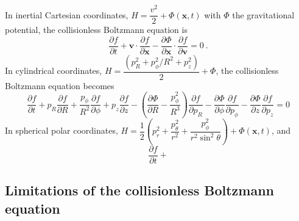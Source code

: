 \documentclass[12pt,a4paper]{article}
\renewcommand{\vec}[1]{\boldsymbol{#1}}
\begin{document}
In inertial Cartesian coordinates, $H = \dfrac{v^2}{2} + \Phi(\vec{x}, t)$ with $\Phi$ the gravitational potential, the collisionless Boltzmann equation is
\begin{equation}
\frac{\partial f}{\partial t} +\vec{v} \cdot \frac{\partial f}{\partial \vec{x}} -\frac{\partial \Phi}{\partial \vec{x}}\cdot \frac{\partial f}{\partial \vec{v}} = 0 ~.
\end{equation}
In cylindrical coordinates, $H = \dfrac{ (p_R^2 +p_\phi^2/R^2 +p_z^2) }{2}+\Phi$, the collisionless Boltzmann equation becomes
\begin{equation}
\frac{\partial f}{\partial t} +p_R \frac{\partial f}{\partial R} +\frac{p_\phi}{R^2} \frac{\partial f}{\partial \phi} +p_z \frac{\partial f}{\partial z} -\left(\frac{\partial \Phi}{\partial R} -\frac{p^2_\phi}{R^3} \right)\frac{\partial f}{\partial p_R} -\frac{\partial \Phi}{\partial \phi} \frac{\partial f}{\partial p_\phi} -\frac{\partial \Phi}{\partial z} \frac{\partial f}{\partial p_z} = 0
\end{equation}
In spherical polar coordinates, $H = \dfrac{1}{2}\left(p_r^2 +\dfrac{p_\theta^2}{r^2} +\dfrac{p_\phi^2}{r^2 \sin^2 \theta} \right) + \Phi(\vec{x}, t)$, and
\begin{equation}
\frac{\partial f}{\partial t} +
\end{equation}

\subsection{Limitations of the collisionless Boltzmann equation}
\end{document}
